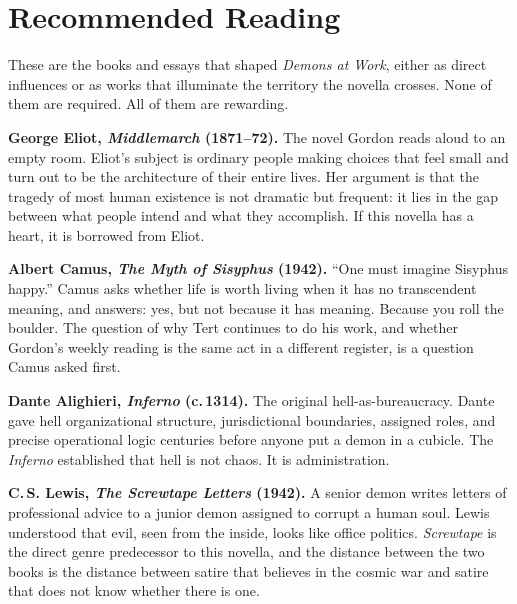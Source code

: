 
\chapter*{Recommended Reading}

These are the books and essays that shaped \emph{Demons at Work}, either as direct influences or as works that illuminate the territory the novella crosses. None of them are required. All of them are rewarding.

\bigskip

\textbf{George Eliot, \emph{Middlemarch} (1871--72).}
The novel Gordon reads aloud to an empty room. Eliot's subject is ordinary people making choices that feel small and turn out to be the architecture of their entire lives. Her argument is that the tragedy of most human existence is not dramatic but frequent: it lies in the gap between what people intend and what they accomplish. If this novella has a heart, it is borrowed from Eliot.

\bigskip

\textbf{Albert Camus, \emph{The Myth of Sisyphus} (1942).}
``One must imagine Sisyphus happy.'' Camus asks whether life is worth living when it has no transcendent meaning, and answers: yes, but not because it has meaning. Because you roll the boulder. The question of why Tert continues to do his work, and whether Gordon's weekly reading is the same act in a different register, is a question Camus asked first.

\bigskip

\textbf{Dante Alighieri, \emph{Inferno} (c.\,1314).}
The original hell-as-bureaucracy. Dante gave hell organizational structure, jurisdictional boundaries, assigned roles, and precise operational logic centuries before anyone put a demon in a cubicle. The \emph{Inferno} established that hell is not chaos. It is administration.

\bigskip

\textbf{C.\,S. Lewis, \emph{The Screwtape Letters} (1942).}
A senior demon writes letters of professional advice to a junior demon assigned to corrupt a human soul. Lewis understood that evil, seen from the inside, looks like office politics. \emph{Screwtape} is the direct genre predecessor to this novella, and the distance between the two books is the distance between satire that believes in the cosmic war and satire that does not know whether there is one.

